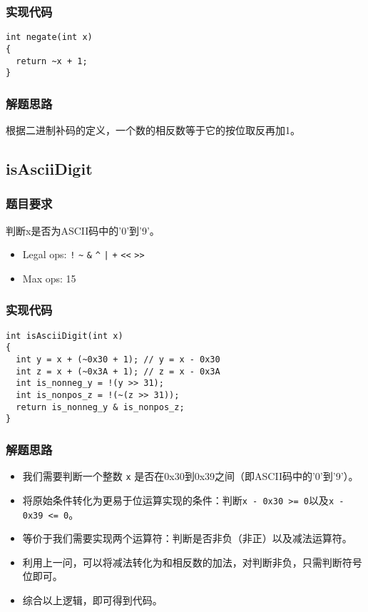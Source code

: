 \documentclass{article}
\begin{document}
\subsubsection{实现代码}
\begin{lstlisting}[caption={negate}]
int negate(int x)
{
  return ~x + 1;
}
\end{lstlisting}

\subsubsection{解题思路}
根据二进制补码的定义，一个数的相反数等于它的按位取反再加1。

\subsection{isAsciiDigit}
\subsubsection{题目要求}
判断x是否为ASCII码中的'0'到'9'。
\begin{itemize}
    \item Legal ops: \texttt{!} \texttt{\~{}} \texttt{\&} \texttt{\^{}} \texttt{|} \texttt{+} \texttt{<<} \texttt{>>}
    \item Max ops: 15
\end{itemize}

\subsubsection{实现代码}
\begin{lstlisting}[caption={isAsciiDigit}]
int isAsciiDigit(int x)
{
  int y = x + (~0x30 + 1); // y = x - 0x30
  int z = x + (~0x3A + 1); // z = x - 0x3A
  int is_nonneg_y = !(y >> 31);
  int is_nonpos_z = !(~(z >> 31));
  return is_nonneg_y & is_nonpos_z;
}
\end{lstlisting}

\subsubsection{解题思路}
\begin{itemize}
  \item 我们需要判断一个整数 \texttt{x} 是否在0x30到0x39之间（即ASCII码中的'0'到'9'）。
  \item 将原始条件转化为更易于位运算实现的条件：判断\texttt{x - 0x30 >= 0}以及\texttt{x - 0x39 <= 0}。
  \item 等价于我们需要实现两个运算符：判断是否非负（非正）以及减法运算符。
  \item 利用上一问，可以将减法转化为和相反数的加法，对判断非负，只需判断符号位即可。
  \item 综合以上逻辑，即可得到代码。
\end{itemize}
\end{document}
